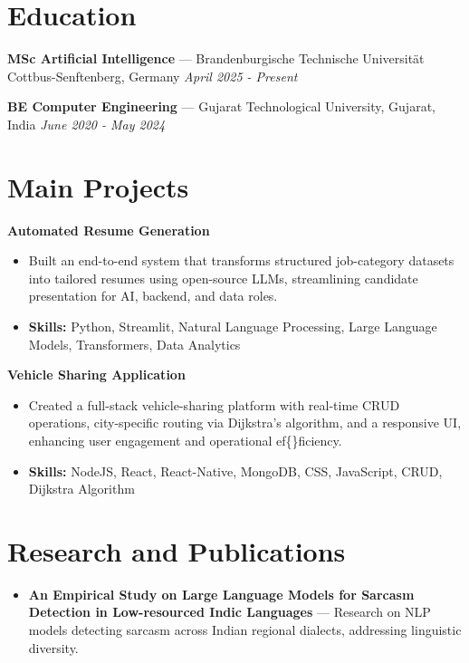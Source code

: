 \documentclass[a4paper,10pt]{article}
\begin{document}
\section*{Education}
\textbf{MSc Artificial Intelligence} — Brandenburgische Technische Universität Cottbus-Senftenberg, Germany \hfill \textit{April 2025 - Present}\par
\vspace{1.5pt}
\textbf{BE Computer Engineering} — Gujarat Technological University, Gujarat, India \hfill \textit{June 2020 - May 2024}\par

\section*{Main Projects}
\textbf{Automated Resume Generation}\par
\vspace{1pt}
\begin{itemize}
  \item Built an end-to-end system that transforms structured job-category datasets into tailored resumes using open-source LLMs, streamlining candidate presentation for AI, backend, and data roles.
  \item \textbf{Skills:} Python, Streamlit, Natural Language Processing, Large Language Models, Transformers, Data Analytics
\end{itemize}
\vspace{3pt}
\textbf{Vehicle Sharing Application}\par
\vspace{1pt}
\begin{itemize}
  \item Created a full-stack vehicle-sharing platform with real-time CRUD operations, city-specific routing via Dijkstra's algorithm, and a responsive UI, enhancing user engagement and operational ef\{\}ficiency.
  \item \textbf{Skills:} NodeJS, React, React-Native, MongoDB, CSS, JavaScript, CRUD, Dijkstra Algorithm
\end{itemize}

\section*{Research and Publications}
\begin{itemize}
\item \textbf{An Empirical Study on Large Language Models for Sarcasm Detection in Low-resourced Indic Languages} — Research on NLP models detecting sarcasm across Indian regional dialects, addressing linguistic diversity.
\end{itemize}
\end{document}

